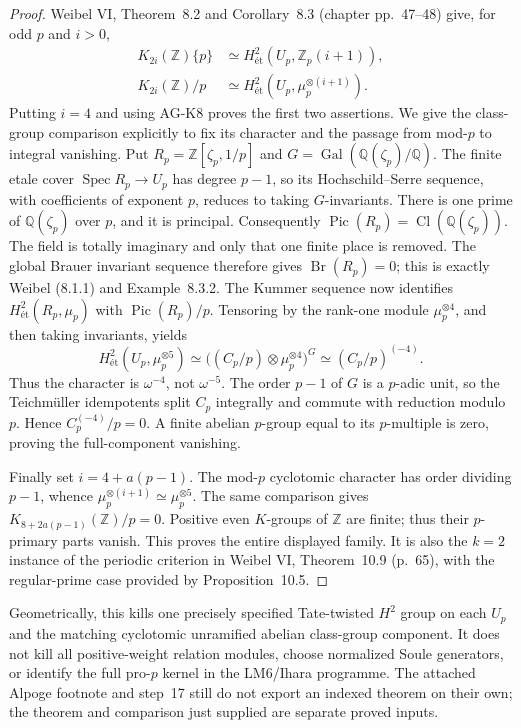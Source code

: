 \begin{proof}
Weibel VI, Theorem~8.2 and Corollary~8.3 (chapter pp.~47--48)
give, for odd $p$ and $i>0$,
\begin{align*}
 K_{2i}(\mathbb Z)\{p\}&\simeq
 H^2_{\text{ét}}(U_p,\mathbb Z_p(i+1)),\\
 K_{2i}(\mathbb Z)/p&\simeq
 H^2_{\text{ét}}(U_p,\mu_p^{\otimes(i+1)}).
\end{align*}
Putting $i=4$ and using AG-K8 proves the first two assertions.
We give the class-group comparison explicitly to fix its
character and the passage from mod-$p$ to integral vanishing.
Put $R_p=\mathbb Z[\zeta_p,1/p]$ and
$G=\operatorname{Gal}(\mathbb Q(\zeta_p)/\mathbb Q)$.
The finite etale cover $\operatorname{Spec}R_p\to U_p$
has degree $p-1$, so its Hochschild--Serre sequence,
with coefficients of exponent $p$, reduces to taking
$G$-invariants.  There is one prime of $\mathbb Q(\zeta_p)$
over $p$, and it is principal.  Consequently
$\operatorname{Pic}(R_p)=\operatorname{Cl}(\mathbb Q(\zeta_p))$.
The field is totally imaginary and only that one finite
place is removed.  The global Brauer invariant sequence
therefore gives $\operatorname{Br}(R_p)=0$; this is exactly
Weibel (8.1.1) and Example~8.3.2.  The Kummer sequence now
identifies $H^2_{\text{ét}}(R_p,\mu_p)$ with
$\operatorname{Pic}(R_p)/p$.
Tensoring by the rank-one module $\mu_p^{\otimes4}$,
and then taking invariants, yields
\[
 H^2_{\text{ét}}(U_p,\mu_p^{\otimes5})
 \simeq\bigl((C_p/p)\otimes\mu_p^{\otimes4}\bigr)^G
 \simeq (C_p/p)^{(-4)}.
\]
Thus the character is $\omega^{-4}$, not $\omega^{-5}$.
The order $p-1$ of $G$ is a $p$-adic unit, so the
Teichmüller idempotents split $C_p$ integrally and commute
with reduction modulo $p$.  Hence
$C_p^{(-4)}/p=0$.  A finite abelian $p$-group equal to its
$p$-multiple is zero, proving the full-component vanishing.

Finally set $i=4+a(p-1)$.  The mod-$p$ cyclotomic
character has order dividing $p-1$, whence
$\mu_p^{\otimes(i+1)}\simeq\mu_p^{\otimes5}$.
The same comparison gives
$K_{8+2a(p-1)}(\mathbb Z)/p=0$.
Positive even $K$-groups of $\mathbb Z$ are finite;
thus their $p$-primary parts vanish.  This proves the
entire displayed family.  It is also the $k=2$
instance of the periodic criterion in Weibel VI,
Theorem~10.9 (p.~65), with the regular-prime case
provided by Proposition~10.5.
\end{proof}

Geometrically, this kills one precisely specified
Tate-twisted $H^2$ group on each $U_p$ and the matching
cyclotomic unramified abelian class-group component.
It does not kill all positive-weight relation modules,
choose normalized Soule generators, or identify the
full pro-$p$ kernel in the LM6/Ihara programme.
The attached Alpoge footnote and step~17 still do not
export an indexed theorem on their own; the theorem
and comparison just supplied are separate proved inputs.

